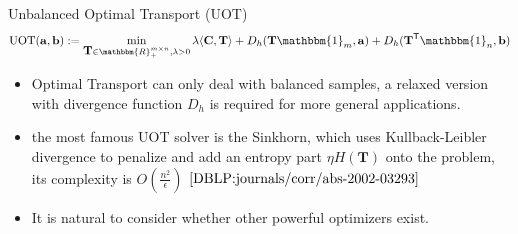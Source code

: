 \documentclass[dvipdfmx,cjk,t,10pt]{beamer}
\newcommand{\tranT}{\mathsf T}
\newcommand{\R}{\mathbbm{R}}
\newcommand{\one}{\mathbbm{1}}
\renewcommand{\vec}[1]{\mathbf{#1}}
\begin{document}
\begin{frame}
	\begin{screen}{Unbalanced Optimal Transport (UOT)}
\begin{equation}
\label{eq:uot}
\operatorname{UOT}(\vec{a},\vec{b}) :=  \min_{ \mat{T} \in \R_{+}^{m \times n},\lambda>0}\lambda \langle \mat{C}, \mat{T} \rangle + D_h(\mat{T} \one_m, \vec{a}) + D_h(\mat{T}^{\tranT} \one_n, \vec{b})
\end{equation}

\end{screen}
	
	\begin{itemize}
	\item Optimal Transport can only deal with balanced samples, a relaxed version with divergence function $D_h$ is required for more general applications.
	\item the most famous UOT solver is the Sinkhorn, which uses Kullback-Leibler divergence to penalize and add an entropy part $\eta H(\mathbf{T})$ onto the problem, its complexity is $O(\frac{n^2}{\epsilon})$ $\cite{DBLP:journals/corr/abs-2002-03293}$
	\item It is natural to consider whether other powerful optimizers exist.
	\end{itemize}
\end{frame}
\end{document}
